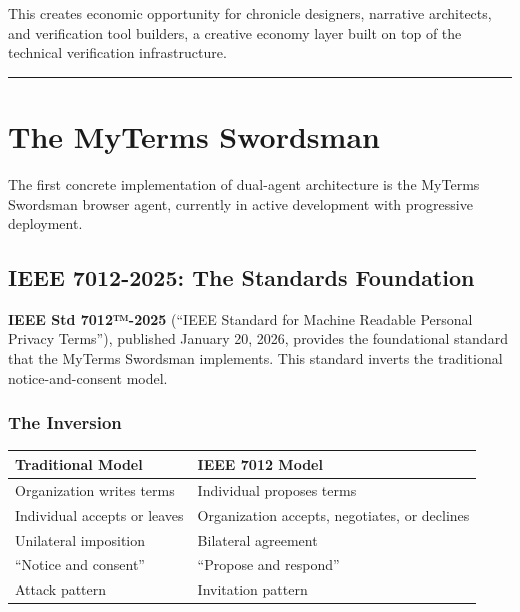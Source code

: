 \documentclass[
  11pt,
]{article}
\newcounter{none} %
\begin{document}
This creates economic opportunity for chronicle designers, narrative
architects, and verification tool builders, a creative economy layer
built on top of the technical verification infrastructure.

\begin{center}\rule{0.5\linewidth}{0.5pt}\end{center}

\section{The MyTerms Swordsman}\label{the-myterms-swordsman}

The first concrete implementation of dual-agent architecture is the
MyTerms Swordsman browser agent, currently in active development with
progressive deployment.

\subsection{IEEE 7012-2025: The Standards
Foundation}\label{ieee-7012-2025-the-standards-foundation}

\textbf{IEEE Std 7012™-2025} (``IEEE Standard for Machine Readable
Personal Privacy Terms''), published January 20, 2026, provides the
foundational standard that the MyTerms Swordsman implements. This
standard inverts the traditional notice-and-consent model.

\subsubsection{The Inversion}\label{the-inversion}

{\def\LTcaptype{none} %
\begin{longtable}[]{@{}
  >{\raggedright\arraybackslash}p{}
  >{\raggedright\arraybackslash}p{}@{}}
\toprule\noalign{}
\begin{minipage}[b]{\linewidth}\raggedright
Traditional Model
\end{minipage} & \begin{minipage}[b]{\linewidth}\raggedright
IEEE 7012 Model
\end{minipage} \\
\midrule\noalign{}
\endhead
\bottomrule\noalign{}
\endlastfoot
Organization writes terms & Individual proposes terms \\
Individual accepts or leaves & Organization accepts, negotiates, or
declines \\
Unilateral imposition & Bilateral agreement \\
``Notice and consent'' & ``Propose and respond'' \\
Attack pattern & Invitation pattern \\
\end{longtable}
}
\end{document}

